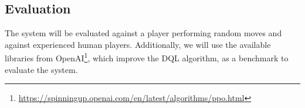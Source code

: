 \documentclass{llncs}
\begin{document}
\subsection{Evaluation}

The system will be evaluated against a player performing random moves and against experienced human players. Additionally, we will use the available libraries from OpenAI\footnote{\url{https://spinningup.openai.com/en/latest/algorithms/ppo.html}}, which improve the DQL algorithm, as a benchmark to evaluate the system. 



{}

\end{document}
